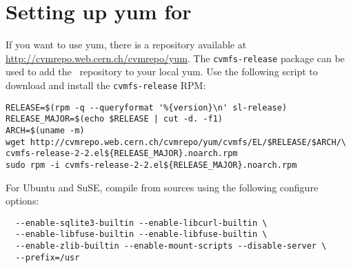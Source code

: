 \section{Setting up yum for \cvmfs}
If you want to use yum, there is a repository available at \url{http://cvmrepo.web.cern.ch/cvmrepo/yum}.
The \texttt{cvmfs-release} package can be used to add the \cvmfs\ repository to your local yum.
Use the following script to download and install the \texttt{cvmfs-release} RPM:
\begin{verbatim}
RELEASE=$(rpm -q --queryformat '%{version}\n' sl-release)
RELEASE_MAJOR=$(echo $RELEASE | cut -d. -f1)
ARCH=$(uname -m)
wget http://cvmrepo.web.cern.ch/cvmrepo/yum/cvmfs/EL/$RELEASE/$ARCH/\
cvmfs-release-2-2.el${RELEASE_MAJOR}.noarch.rpm
sudo rpm -i cvmfs-release-2-2.el${RELEASE_MAJOR}.noarch.rpm
\end{verbatim}
For Ubuntu and SuSE, compile from sources using the following configure options: 
\begin{verbatim}
  --enable-sqlite3-builtin --enable-libcurl-builtin \
  --enable-libfuse-builtin --enable-libfuse-builtin \
  --enable-zlib-builtin --enable-mount-scripts --disable-server \
  --prefix=/usr
\end{verbatim}

